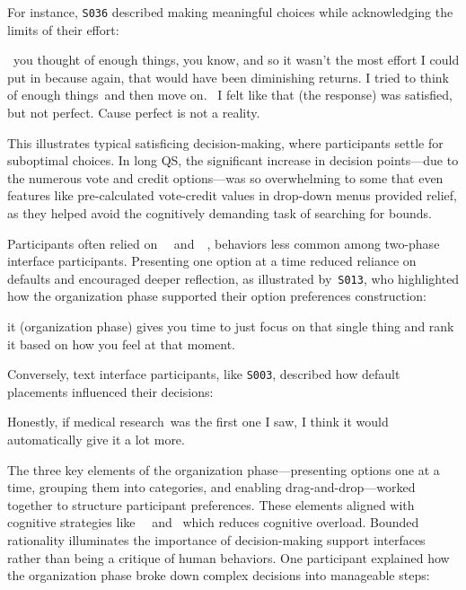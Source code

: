 For instance, \texttt{S036} described making meaningful choices while acknowledging the limits of their effort:

\begin{displayquote}
~\bracketellipsis you thought of enough things, you know, and so it wasn't the most effort I could put in because again, that would have been diminishing returns. I tried to think of enough things~\bracketellipsis and then move on.~\bracketellipsis 
I felt like that (the response) was satisfied, but not perfect. Cause perfect is not a reality. \hfill{}
\end{displayquote}

This illustrates typical satisficing decision-making, where participants settle for suboptimal choices. In long QS, the significant increase in decision points—due to the numerous vote and credit options—was so overwhelming to some that even features like pre-calculated vote-credit values in drop-down menus provided relief, as they helped avoid the cognitively demanding task of searching for bounds.

Participants often relied on~\textit{}~\cite{tverskyJudgmentUncertaintyHeuristics1974} and~\textit{}~\cite{thalerNudgeImprovingDecisions2008a}, behaviors less common among two-phase interface participants. Presenting one option at a time reduced reliance on defaults and encouraged deeper reflection, as illustrated by~\texttt{S013}, who highlighted how the organization phase supported their option preferences construction: 

\begin{displayquote}
\bracketellipsis it (organization phase) gives you time to just focus on that single thing and rank it based on how you feel at that moment. \hfill{}
\end{displayquote}

Conversely, text interface participants, like \texttt{S003}, described how default placements influenced their decisions:

\begin{displayquote}
    Honestly, if medical research~\bracketellipsis was the first one I saw, I think it would automatically give it a lot more. \hfill{}
\end{displayquote}

The three key elements of the organization phase—presenting options one at a time, grouping them into categories, and enabling drag-and-drop—worked together to structure participant preferences. These elements aligned with cognitive strategies like~\textit{}~\cite{simonSciencesArtificial1996} and~\textit{} which reduces cognitive overload. Bounded rationality illuminates the importance of decision-making support interfaces rather than being a critique of human behaviors. One participant explained how the organization phase broke down complex decisions into manageable steps:


